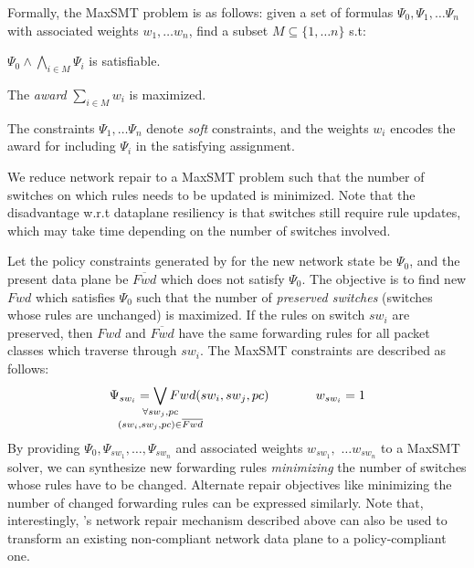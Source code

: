 Formally, the MaxSMT problem is as follows:
given a set of formulas $\Psi_0, \Psi_1, \ldots \Psi_n$ with
associated weights $w_1, \ldots w_n$, find a subset $M \subseteq \{1,
\ldots n\}$ s.t:
\begin{compactenumerate}
	\item $\Psi_0 \wedge \bigwedge_{i \in M} \Psi_i$ is satisfiable.
	\item The \emph{award} $\sum_{i \in M} w_i$  is maximized.
\end{compactenumerate}
The constraints $\Psi_1, \ldots \Psi_n$ denote \emph{soft} constraints, and
the weights $w_i$ encodes the award for including $\Psi_i$ in the satisfying
assignment. 

We reduce network repair to a MaxSMT problem such that the number of
switches on which rules needs to be updated is minimized. Note that
the disadvantage w.r.t dataplane resiliency is that switches still
require rule updates, which may take time depending on the number of
switches involved.

 Let the policy constraints generated by \name for the new network
 state be $\Psi_0$, and the present data plane be $\overline{Fwd}$
 which does not satisfy $\Psi_0$. The objective is to find new $Fwd$
 which satisfies $\Psi_0$ such that the number of \emph{preserved
   switches} (switches whose rules are unchanged) is maximized. If the
 rules on switch $sw_i$ are preserved, then $Fwd$ and $\overline{Fwd}$
 have the same forwarding rules for all packet classes which traverse
 through $sw_i$. The MaxSMT constraints are described as follows:
\begin{equation}
	\Psi_{sw_i} =  
	  \bigvee_{\mathclap{\substack{\forall sw_j, pc \\
			  		(sw_i, sw_j, pc) \in \overline{Fwd}}}} Fwd(sw_i, sw_j, pc) 
			~~~~~~~~~~~ 
			w_{sw_i}= 1
\end{equation}
By providing $\Psi_0, \Psi_{sw_1}, \ldots, \Psi_{sw_n}$ and associated
weights $w_{sw_1},$ $\ldots w_{sw_n}$ to a MaxSMT solver, we can
synthesize new forwarding rules \emph{minimizing} the number of
switches whose rules have to be changed.  Alternate repair objectives
like minimizing the number of changed forwarding rules can be
expressed similarly. Note that, interestingly, \name's network repair
mechanism described above can also be used to transform an existing
non-compliant network data plane to a policy-compliant one.

